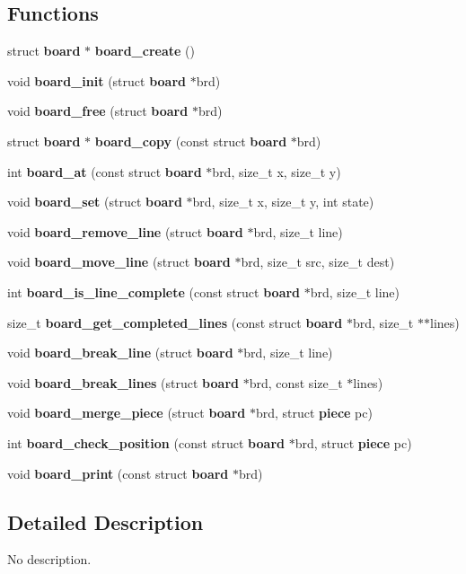 \subsection*{Functions}
\begin{DoxyCompactItemize}
\item 
struct \textbf{ board} $\ast$ \textbf{ board\+\_\+create} ()
\item 
void \textbf{ board\+\_\+init} (struct \textbf{ board} $\ast$brd)
\item 
void \textbf{ board\+\_\+free} (struct \textbf{ board} $\ast$brd)
\item 
struct \textbf{ board} $\ast$ \textbf{ board\+\_\+copy} (const struct \textbf{ board} $\ast$brd)
\item 
int \textbf{ board\+\_\+at} (const struct \textbf{ board} $\ast$brd, size\+\_\+t x, size\+\_\+t y)
\item 
void \textbf{ board\+\_\+set} (struct \textbf{ board} $\ast$brd, size\+\_\+t x, size\+\_\+t y, int state)
\item 
void \textbf{ board\+\_\+remove\+\_\+line} (struct \textbf{ board} $\ast$brd, size\+\_\+t line)
\item 
void \textbf{ board\+\_\+move\+\_\+line} (struct \textbf{ board} $\ast$brd, size\+\_\+t src, size\+\_\+t dest)
\item 
int \textbf{ board\+\_\+is\+\_\+line\+\_\+complete} (const struct \textbf{ board} $\ast$brd, size\+\_\+t line)
\item 
size\+\_\+t \textbf{ board\+\_\+get\+\_\+completed\+\_\+lines} (const struct \textbf{ board} $\ast$brd, size\+\_\+t $\ast$$\ast$lines)
\item 
void \textbf{ board\+\_\+break\+\_\+line} (struct \textbf{ board} $\ast$brd, size\+\_\+t line)
\item 
void \textbf{ board\+\_\+break\+\_\+lines} (struct \textbf{ board} $\ast$brd, const size\+\_\+t $\ast$lines)
\item 
void \textbf{ board\+\_\+merge\+\_\+piece} (struct \textbf{ board} $\ast$brd, struct \textbf{ piece} pc)
\item 
int \textbf{ board\+\_\+check\+\_\+position} (const struct \textbf{ board} $\ast$brd, struct \textbf{ piece} pc)
\item 
void \textbf{ board\+\_\+print} (const struct \textbf{ board} $\ast$brd)
\end{DoxyCompactItemize}


\subsection{Detailed Description}
No description. 

